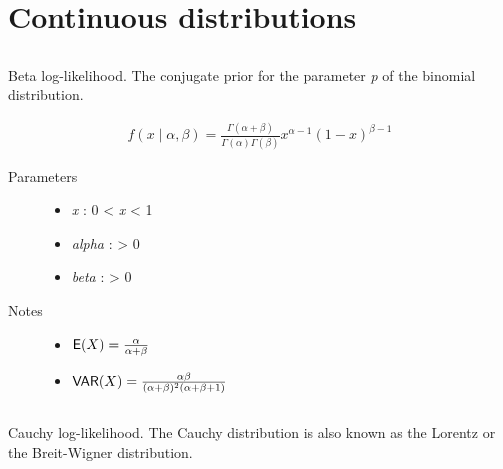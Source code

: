 \documentclass[]{jss}
\begin{document}
\section{Continuous distributions}
\label{chap:continuous-distributions} 


\subsection[beta]{ }

Beta log-likelihood. The conjugate prior for the parameter \emph{p} of the binomial distribution.

\begin{eqnarray*}
    f(x \mid \alpha, \beta) = \frac{\Gamma(\alpha + \beta)}{\Gamma(\alpha) \Gamma(\beta)} x^{\alpha - 1} (1 - x)^{\beta - 1}
\end{eqnarray*}

\begin{description}
\item[Parameters] \leavevmode\begin{itemize}
\item {} 
\emph{x} : 0 \textless{} \emph{x} \textless{} 1

\item {} 
\emph{alpha} : \textgreater{} 0

\item {} 
\emph{beta} : \textgreater{} 0

\end{itemize}


\item[Notes]\leavevmode\begin{itemize}
\item {} 
$\mathsf{E}(X)=\frac{\alpha}{\alpha+\beta}$

\item {} 
$\mathsf{VAR}(X)=\frac{\alpha \beta}{(\alpha+\beta)^2(\alpha+\beta+1)}$

\end{itemize}

\end{description}


\subsection[Cauchy]{}


Cauchy log-likelihood. The Cauchy distribution is also known as the
Lorentz or the Breit-Wigner distribution.
\end{document}
